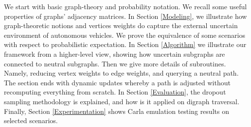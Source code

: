 We start with basic graph-theory and probability notation. We recall some useful properties of graphs' adjacency matrices. In Section \ref{Modeling}, we illustrate how graph-theoretic notions and vertices weights do capture the external uncertain environment of autonomous vehicles. We prove the equivalence of some scenarios with respect to probabilistic expectation. In Section \ref{Algorithm} we illustrate our framework from a higher-level view, showing how uncertain subgraphs are connected to neutral subgraphs. Then we give more details of subroutines. Namely, reducing vertex weights to edge weights, and querying a neutral path. The section ends with dynamic updates whereby a path is adjusted without recomputing everything from scratch. In Section \ref{Evaluation}, the dropout sampling methodology is explained, and how is it applied on digraph traversal. Finally, Section \ref{Experimentation} shows Carla emulation testing results on selected scenarios.
